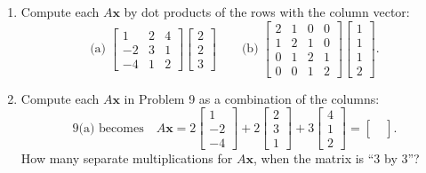 \documentclass[14pt, a4paper]{article}
\begin{document}
\begin{enumerate}[resume]
    \item Compute each $A\boldsymbol{x}$ by dot products of the rows with the column vector:
          \[
              \text{(a)}\;
              \begin{bmatrix}
                  1  & 2 & 4 \\
                  -2 & 3 & 1 \\
                  -4 & 1 & 2
              \end{bmatrix}
              \begin{bmatrix} 2 \\ 2 \\ 3 \end{bmatrix}
              \qquad
              \text{(b)}\;
              \begin{bmatrix}
                  2 & 1 & 0 & 0 \\
                  1 & 2 & 1 & 0 \\
                  0 & 1 & 2 & 1 \\
                  0 & 0 & 1 & 2
              \end{bmatrix}
              \begin{bmatrix} 1 \\ 1 \\ 1 \\ 2 \end{bmatrix}.
          \]

    \item Compute each $A\boldsymbol{x}$ in Problem 9 as a combination of the columns:
          \[
              9\text{(a) becomes}\quad
              A\boldsymbol{x} =
              2\begin{bmatrix} 1 \\ -2 \\ -4 \end{bmatrix}
              + 2\begin{bmatrix} 2 \\ 3 \\ 1 \end{bmatrix}
              + 3\begin{bmatrix} 4 \\ 1 \\ 2 \end{bmatrix}
              = \begin{bmatrix} \; \\ \; \\ \; \end{bmatrix}.
          \]
          How many separate multiplications for $A\boldsymbol{x}$, when the matrix is ``3 by 3''?


\end{enumerate}
\end{document}
